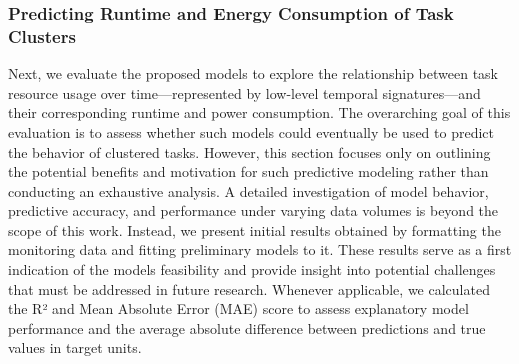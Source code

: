 \subsubsection{Predicting Runtime and Energy Consumption of Task Clusters}
\label{sec:evaluation_task_cluster_runtime_and_energy_prediction}
Next, we evaluate the proposed models to explore the relationship between task resource usage over time—represented by low-level temporal signatures—and their corresponding runtime and power consumption. The overarching goal of this evaluation is to assess whether such models could eventually be used to predict the behavior of clustered tasks. However, this section focuses only on outlining the potential benefits and motivation for such predictive modeling rather than conducting an exhaustive analysis.
A detailed investigation of model behavior, predictive accuracy, and performance under varying data volumes is beyond the scope of this work. Instead, we present initial results obtained by formatting the monitoring data and fitting preliminary models to it. These results serve as a first indication of the models feasibility and provide insight into potential challenges that must be addressed in future research. Whenever applicable, we calculated the R² and Mean Absolute Error (MAE) score to assess explanatory model performance and the average absolute difference between predictions and true values in target units.

